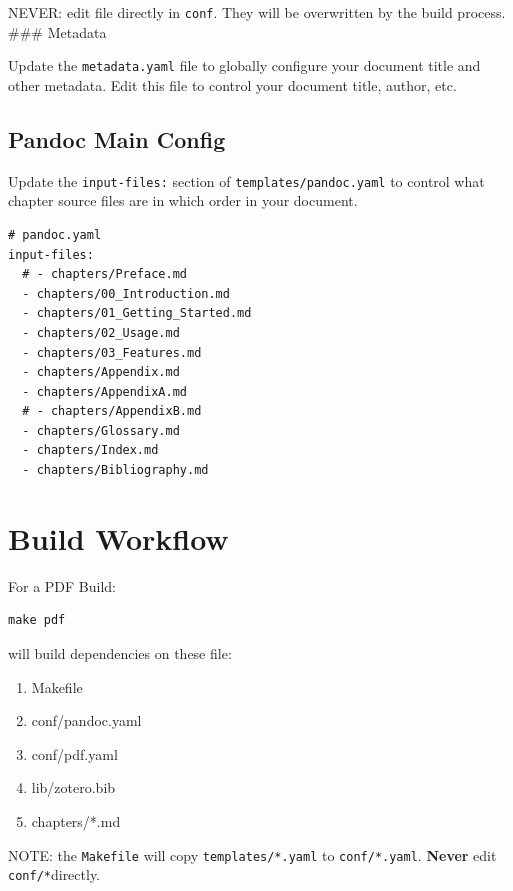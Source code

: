 \documentclass[
  12pt,
  openany]{book}
\providecommand{\tightlist}{%
  \setlength{\itemsep}{0pt}\setlength{\parskip}{0pt}}
\begin{document}
\begin{cautionbox}
NEVER: edit file directly in \texttt{conf}. They will be overwritten by
the build process. \#\#\# Metadata
\end{cautionbox}

Update the \texttt{metadata.yaml} file to globally configure your
document title and other metadata. Edit this file to control your
document title, author, etc.

\subsection{Pandoc Main Config}\label{pandoc-main-config}

Update the \texttt{input-files:} section of
\texttt{templates/pandoc.yaml} to control what chapter source files are
in which order in your document.

\begin{verbatim}
# pandoc.yaml
input-files:
  # - chapters/Preface.md
  - chapters/00_Introduction.md
  - chapters/01_Getting_Started.md
  - chapters/02_Usage.md
  - chapters/03_Features.md
  - chapters/Appendix.md
  - chapters/AppendixA.md
  # - chapters/AppendixB.md
  - chapters/Glossary.md
  - chapters/Index.md
  - chapters/Bibliography.md
\end{verbatim}

\section{Build Workflow}\label{build-workflow}

For a PDF Build:

\begin{verbatim}
make pdf
\end{verbatim}

will build dependencies on these file:

\begin{enumerate}
\def\labelenumi{\arabic{enumi}.}
\tightlist
\item
  Makefile
\item
  conf/pandoc.yaml
\item
  conf/pdf.yaml
\item
  lib/zotero.bib
\item
  chapters/*.md
\end{enumerate}

NOTE: the \texttt{Makefile} will copy \texttt{templates/*.yaml} to
\texttt{conf/*.yaml}. \textbf{Never} edit \texttt{conf/*}directly.
\end{document}
